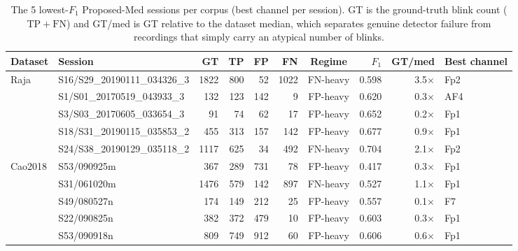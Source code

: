 \begin{table}[ht]
  \centering
  \scriptsize
  \setlength{\tabcolsep}{4pt}
  \caption{The 5 lowest-$F_1$ Proposed-Med sessions per corpus (best channel per session). GT is the ground-truth blink count ($\mathrm{TP}+\mathrm{FN}$) and GT/med is GT relative to the dataset median, which separates genuine detector failure from recordings that simply carry an atypical number of blinks.}
  \label{tab:failure_analysis}
  \begin{tabular}{llrrrrcrrl}
    \toprule
    Dataset & Session & GT & TP & FP & FN & Regime & $F_1$ & GT/med & Best channel \\
    \midrule
    Raja & S16/S29\_20190111\_034326\_3 & 1822 & 800 & 52 & 1022 & FN-heavy & 0.598 & 3.5$\times$ & Fp2 \\
     & S1/S01\_20170519\_043933\_3 & 132 & 123 & 142 & 9 & FP-heavy & 0.620 & 0.3$\times$ & AF4 \\
     & S3/S03\_20170605\_033654\_3 & 91 & 74 & 62 & 17 & FP-heavy & 0.652 & 0.2$\times$ & Fp1 \\
     & S18/S31\_20190115\_035853\_2 & 455 & 313 & 157 & 142 & FP-heavy & 0.677 & 0.9$\times$ & Fp1 \\
     & S24/S38\_20190129\_035118\_2 & 1117 & 625 & 34 & 492 & FN-heavy & 0.704 & 2.1$\times$ & Fp2 \\
    \midrule
    Cao2018 & S53/090925m & 367 & 289 & 731 & 78 & FP-heavy & 0.417 & 0.3$\times$ & Fp1 \\
     & S31/061020m & 1476 & 579 & 142 & 897 & FN-heavy & 0.527 & 1.1$\times$ & Fp1 \\
     & S49/080527n & 174 & 149 & 212 & 25 & FP-heavy & 0.557 & 0.1$\times$ & F7 \\
     & S22/090825n & 382 & 372 & 479 & 10 & FP-heavy & 0.603 & 0.3$\times$ & Fp1 \\
     & S53/090918n & 809 & 749 & 912 & 60 & FP-heavy & 0.606 & 0.6$\times$ & Fp1 \\
    \bottomrule
  \end{tabular}
\end{table}
